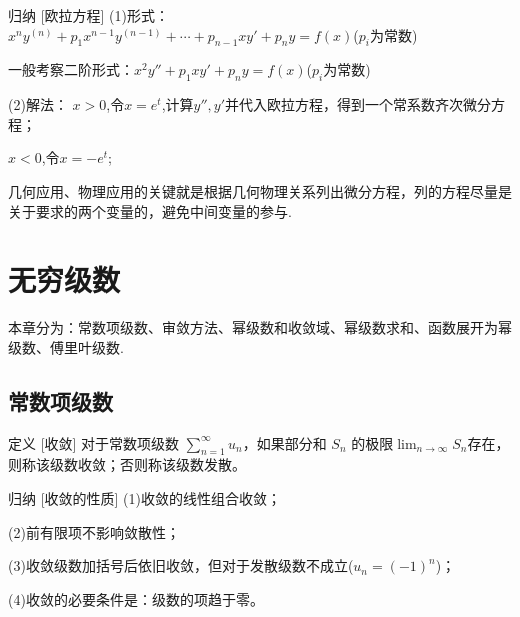 \documentclass[a4paper,12pt,oneside,fontset=none]{ctexbook}
\let\oldlim\lim
\renewcommand{\lim}{\displaystyle\oldlim}
\let\oldsum\sum
\renewcommand{\sum}{\displaystyle\oldsum}
\newenvironment{induction}[1][]{\begin{thmBox}{归纳}{#1}}{\end{thmBox}}
\newcounter{definition}[chapter]
\newenvironment{definition}[1][]{\begin{defBox}{定义}{#1}}{\end{defBox}}
\numberwithin{equation}{chapter}
\begin{document}
\begin{induction}
    [欧拉方程]
    (1)形式：$x^ny^{(n)}+p_1x^{n-1}y^{(n-1)}+\cdots+p_{n-1}xy'+p_ny=f(x)$($p_i$为常数)

    一般考察二阶形式：$x^2y''+p_1xy'+p_ny=f(x)$($p_i$为常数)

    (2)解法：
    $x>0$,令$x=e^t$,计算$y'',y'$并代入欧拉方程，得到一个常系数齐次微分方程；
    
    $x<0$,令$x=-e^t$;
\end{induction}

几何应用、物理应用的关键就是根据几何物理关系列出微分方程，列的方程尽量是关于要求的两个变量的，避免中间变量的参与.



\chapter{无穷级数}

本章分为：常数项级数、审敛方法、幂级数和收敛域、幂级数求和、函数展开为幂级数、傅里叶级数.

\section{常数项级数}
\begin{definition}
    [收敛]
    对于常数项级数 $\sum_{n=1}^{\infty} u_n$，如果部分和 $S_n$ 的极限$\lim_{n \to \infty} S_n$存在，则称该级数收敛；否则称该级数发散。
\end{definition}
\begin{induction}
    [收敛的性质]
    (1)收敛的线性组合收敛；
    
    (2)前有限项不影响敛散性；
    
    (3)收敛级数加括号后依旧收敛，但对于发散级数不成立($u_n = (-1)^n$)；
    
    (4)收敛的必要条件是：级数的项趋于零。
\end{induction}
\end{document}
